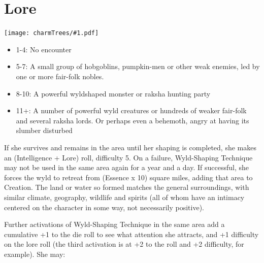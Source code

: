 \documentclass[oneside]{book}
\newenvironment{Ability}[1]{%
  \section{#1}%
  \vspace{-0.25in}\hspace*{-0.75in}\texttt{[image: charmTrees/\#1.pdf]}%
  \begin{multicols}{2}
}
{
  \end{multicols}
}
\begin{document}
\begin{Ability}{Lore}
  \begin{itemize}
    \item 1-4: No encounter
    \item 5-7: A small group of hobgoblins, pumpkin-men or other weak enemies, led by one or more fair-folk nobles.
    \item 8-10: A powerful wyldshaped monster or raksha hunting party
    \item 11+: A number of powerful wyld creatures or hundreds of weaker fair-folk and several raksha lords. Or perhaps even a behemoth, angry at having its slumber disturbed
  \end{itemize}

  If she survives and remains in the area until her shaping is completed, she makes an (Intelligence + Lore) roll, difficulty 5. On a failure, Wyld-Shaping Technique may not be used in the same area again for a year and a day. If successful, she forces the wyld to retreat from (Essence x 10) square miles, adding that area to Creation. The land or water so formed matches the general surroundings, with similar climate, geography, wildlife and spirits (all of whom have an intimacy centered on the character in some way, not necessarily positive).

  Further activations of Wyld-Shaping Technique in the same area add a cumulative +1 to the die roll to see what attention she attracts, and +1 difficulty on the lore roll (the third activation is at +2 to the roll and +2 difficulty, for example). She may:


\end{Ability}
\end{document}
